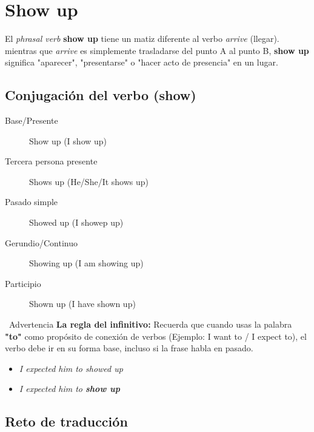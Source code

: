 \documentclass[
10pt, %
a4paper, %
oneside, %
headinclude,footinclude, %
BCOR5mm, %
]{scrartcl}
\begin{document}
\newpage
\section{Show up}
El \textit{phrasal verb} \textbf{show up} tiene un matiz diferente al verbo \textit{arrive} (llegar). mientras que \textit{arrive} es simplemente trasladarse del punto A al punto B, \textbf{show up} significa "aparecer", "presentarse" o "hacer acto de presencia" en un lugar.

\subsection{Conjugación del verbo (show)}

\begin{description}
	\item[Base/Presente] Show up (I show up)
	\item[Tercera persona presente] Shows up (He/She/It shows up)
	\item[Pasado simple] Showed up (I showep up)
	\item[Gerundio/Continuo] Showing up (I am showing up)
	\item[Participio] Shown up (I have shown up)
\end{description}

\begin{WarningBox}{ \, Advertencia} 
	\textbf{La regla del infinitivo:} Recuerda que cuando usas la palabra \textbf{"to"} como propósito de conexión de verbos (Ejemplo: I want to / I expect to), el verbo debe ir en su forma base, incluso si la frase habla en pasado. 
\end{WarningBox}

\begin{itemize}
	\item \textcolor{red}{} \textit{I expected him to showed up}
	\item \textcolor{green}{} \textit{I expected him to \textbf{show up}}
\end{itemize}

\newpage
\subsection{Reto de traducción}
\end{document}
